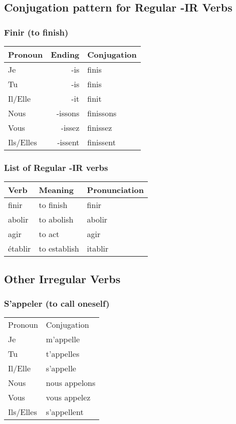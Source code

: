 \subsection{Conjugation pattern for Regular -IR Verbs}

\subsubsection{Finir (to finish)}
\begin{tabular}{| l | r | l |}
\hline
Pronoun 	& 	Ending 	& 	Conjugation	\\ 	\hline
Je		    &	-is	    & 	finis       \\ 	\hline
Tu		    &	-is	    &	finis       \\	\hline
Il/Elle		&	-it	    &	finit       \\	\hline
Nous		&	-issons &	finissons   \\	\hline
Vous		&	-issez  &	finissez    \\	\hline
Ils/Elles	&	-issent	&	finissent   \\	\hline
\end{tabular}

\subsubsection{List of Regular -IR verbs}
\begin{longtable}{| l | l | l |}
\hline
Verb 		& Meaning 		& Pronunciation	\\
\hline
\endhead
finir       & to finish       & finir       \\	\hline
abolir      & to abolish      & abolir      \\	\hline
agir        & to act          & agir        \\	\hline
\'etablir   & to establish    & itablir     \\	\hline
\end{longtable}


\subsection{Other Irregular Verbs}

\subsubsection{S'appeler (to call oneself)}
\begin{tabular}{| l | l |}
\hline
Pronoun 	& 	Conjugation	\\
Je		&	m'appelle	\\
Tu		&	t'appelles	\\
Il/Elle		&	s'appelle	\\
Nous		&	nous appelons	\\
Vous		&	vous appelez	\\
Ils/Elles	&	s'appellent	\\
\hline
\end{tabular}


